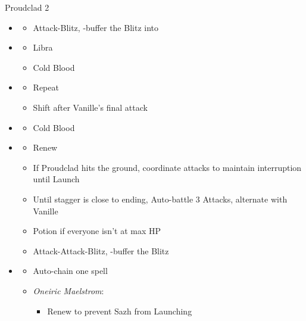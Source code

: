 \begin{battle}[2:01]{Proudclad 2}
  \begin{multicols}{2}
    \begin{itemize}
      \item \second
            \begin{itemize}
              \item Attack-Blitz, \rav-buffer the Blitz into
            \end{itemize}
      \item \sixth
            \begin{itemize}
              \item Libra
              \item Cold Blood
            \end{itemize}
      \item \fifth
            \begin{itemize}
              \item Repeat
              \item Shift after Vanille's final attack
            \end{itemize}
      \item \first
            \begin{itemize}
              \item Cold Blood
            \end{itemize}
      \item \second
            \begin{itemize}
              \item Renew
              \item If Proudclad hits the ground, coordinate attacks to maintain interruption until Launch
              \item Until stagger is close to ending, Auto-battle 3 Attacks, alternate with Vanille
              \item Potion if everyone isn't at max HP
              \item Attack-Attack-Blitz, \rav-buffer the Blitz
            \end{itemize}
      \item \third
            \begin{itemize}
              \item Auto-chain one spell
              \item \textit{Oneiric Maelstrom}:
                    \begin{itemize}
                      \item Renew to prevent Sazh from Launching

\end{itemize}
\end{itemize}
\end{itemize}
\end{multicols}
\end{battle}
